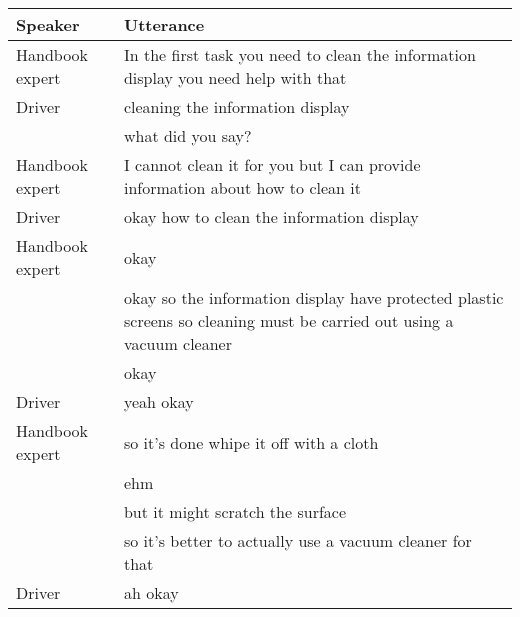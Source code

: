\begin{table}[H]
\begin{tabular}{p{3cm}p{8cm}}
Speaker & Utterance \\
\hline
Handbook expert & In the first task you need to clean the information display you need help with that                                   \\
Driver          & cleaning the information display                                                                                      \\
                & what did you say?                                                                                                     \\
Handbook expert & I cannot clean it for you but I can provide information about how to clean it                                         \\
Driver          & okay how to clean the information display                                                                             \\
Handbook expert & okay                                                                                                                  \\
 & okay so the information display have protected plastic screens so cleaning must be carried out using a vacuum cleaner \\
                & okay                                                                                                                  \\
Driver          & yeah okay                                                                                                             \\
Handbook expert & so it's done whipe it off with a cloth                                                                                \\
                & ehm                                                                                                                   \\
 & but it might scratch the surface                                                                                       \\
 & so it's better to actually use a vacuum cleaner for that                                                              \\
Driver          & ah okay                                                                                                               \\

\end{tabular}
\end{table}

